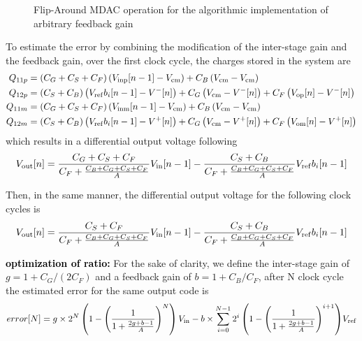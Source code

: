 \begin{figure}[htp]
\begin{subfigure}[b]{0.45\textwidth}
		\label{fig:algo-mdac-phi2}
	\end{subfigure}
	\caption{Flip-Around MDAC operation for the algorithmic implementation of arbitrary feedback gain}
	\label{fig:algo-mdac-cb}
\end{figure}

To estimate the error by combining the modification of the inter-stage gain and the feedback gain, over the first clock cycle, the charges stored in the system are
\begin{align}
Q_{11p} &= \left(C_G+C_S+C_F \right) \left( V_{\rm inp}[n-1] - V_{\rm cm} \right) + C_B \left(V_{\rm cm}-V_{\rm cm} \right) \\
Q_{12p} &= \left(C_S+C_B \right) \left( V_{\rm ref}b_i[n-1] - V^{-}[n] \right) + C_G \left(V_{\rm cm}-V^{-}[n] \right)  + C_F \left(V_{\rm op}[n]-V^{-}[n] \right) \\
Q_{11m} &= \left(C_G+C_S+C_F \right) \left( V_{\rm inm}[n-1] - V_{\rm cm} \right) + C_B \left(V_{\rm cm}-V_{\rm cm} \right) \\
Q_{12m} &= \left(C_S+C_B \right) \left( V_{\rm ref}b_i[n-1] - V^{+}[n] \right) + C_G \left(V_{\rm cm}-V^{+}[n] \right)  + C_F \left(V_{\rm om}[n]-V^{+}[n] \right)
\end{align}
which results in a differential output voltage following
\begin{equation}
	V_{\rm out}[n] = \frac{C_G+C_S+C_F}{C_F+\frac{C_B+C_G+C_S+C_F}{A}} V_{\rm in}[n-1] - \frac{C_S+C_B}{C_F+\frac{C_B+C_G+C_S+C_F}{A}} V_{\rm ref}b_i[n-1]
\end{equation}

Then, in the same manner, the differential output voltage for the following clock cycles is
\begin{equation}
	V_{\rm out}[n] = \frac{C_S+C_F}{C_F+\frac{C_B+C_G+C_S+C_F}{A}} V_{\rm in}[n-1] - \frac{C_S+C_B}{C_F+\frac{C_B+C_G+C_S+C_F}{A}} V_{\rm ref}b_i[n-1]
\end{equation}

\textbf{\textcolor{black}{optimization of ratio:}}
For the sake of clarity, we define the inter-stage gain of \(g = 1+C_G/(2C_F)\) and a feedback gain of \(b = 1+C_B/C_F\), after N clock cycle the estimated error for the same output code is
\begin{equation}
	error[N] = g \times 2^N \left(1-{\left(\frac{1}{1+\frac{2g+b-1}{A}} \right)}^N \right) V_{\rm in} - b \times \sum_{i=0}^{N-1}{2^i\left(1-{\left(\frac{1}{1+\frac{2g+b-1}{A}} \right)}^{i+1} \right)} V_{\rm ref}
\end{equation}

